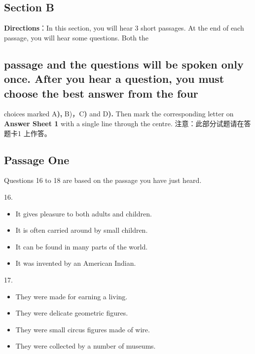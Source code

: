 \documentclass[UTF8,11pt]{ctexart}
\begin{document}
\subsection*{\textbf{Section B}}


\textbf{Directions}：In this section, you will hear 3 short passages. At the end of each passage, you will hear some questions. Both the


\subsection*{passage and the questions will be spoken only once\textbf{.} After you hear a question\textbf{,} you must choose the best answer from the four}


choices marked A\textbf{),} B)，C\textbf{)} and D\textbf{).} Then mark the corresponding letter on\textbf{ Answer Sheet 1} with a single line through the centre. 注意：此部分试题请在答题卡1 上作答。


\subsection*{Passage One}


Questions 16 to 18 are based on the passage you have just heard.


16.


\begin{itemize}[leftmargin=2em,itemsep=.2em,topsep=.4em]\item[A.] It gives pleasure to both adults and children.
\item[B.] It is often carried around by small children.
\item[C.] It can be found in many parts of the world.
\end{itemize}

\begin{itemize}[leftmargin=2em,itemsep=.2em,topsep=.4em]\item[D.] It was invented by an American Indian.
\end{itemize}

17.


\begin{itemize}[leftmargin=2em,itemsep=.2em,topsep=.4em]\item[A.] They were made for earning a living.
\item[B.] They were delicate geometric figures.
\item[C.] They were small circus figures made of wire.
\item[D.] They were collected by a number of museums.
\end{itemize}
\end{document}
